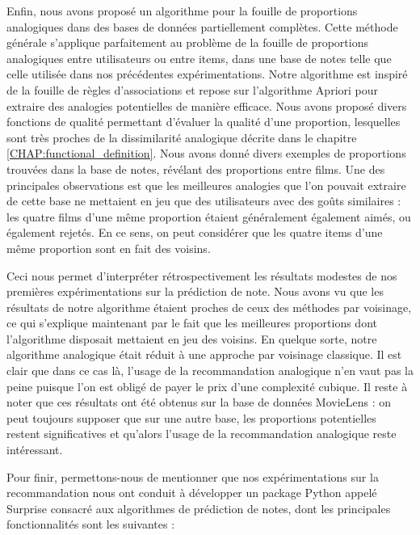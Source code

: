 Enfin, nous avons proposé un algorithme pour la fouille de proportions
analogiques dans des bases de données partiellement complètes. Cette méthode
générale s'applique parfaitement au problème de la fouille de proportions
analogiques entre utilisateurs ou entre items, dans une base de notes telle que
celle utilisée dans nos précédentes expérimentations. Notre algorithme est
inspiré de la fouille de règles d'associations et repose sur l'algorithme
Apriori pour extraire des analogies potentielles de manière efficace. Nous
avons proposé divers fonctions de qualité permettant d'évaluer la qualité d'une
proportion, lesquelles sont très proches de la dissimilarité analogique décrite
dans le chapitre \ref{CHAP:functional_definition}. Nous avons donné divers
exemples de proportions trouvées dans la base de notes, révélant des
proportions entre films. Une des principales observations est que les meilleures
analogies que l'on pouvait extraire de cette base ne mettaient en jeu que des
utilisateurs avec des goûts similaires : les quatre films d'une même
proportion étaient généralement également aimés, ou également rejetés. En ce
sens, on peut considérer que les quatre items d'une même proportion sont en
fait des voisins.

Ceci nous permet d'interpréter rétrospectivement les résultats modestes de nos
premières expérimentations sur la prédiction de note. Nous avons vu que les
résultats de notre algorithme étaient proches de ceux des méthodes par
voisinage, ce qui s'explique maintenant par le fait que les meilleures
proportions dont l'algorithme disposait mettaient en jeu des voisins. En
quelque sorte, notre algorithme analogique était réduit à une approche par
voisinage classique. Il est clair que dans ce cas là, l'usage de la
recommandation analogique n'en vaut pas la peine puisque l'on est obligé de
payer le prix d'une complexité cubique. Il reste à noter que ces résultats ont
été obtenus sur la base de données MovieLens : on peut toujours supposer que
sur une autre base, les proportions potentielles restent significatives et
qu'alors l'usage de la recommandation analogique reste intéressant.

Pour finir, permettons-nous de mentionner que nos expérimentations sur la
recommandation nous ont conduit à développer un package Python appelé Surprise
\cite{Surprise} consacré aux algorithmes de prédiction de notes, dont les
principales fonctionnalités sont les suivantes :

